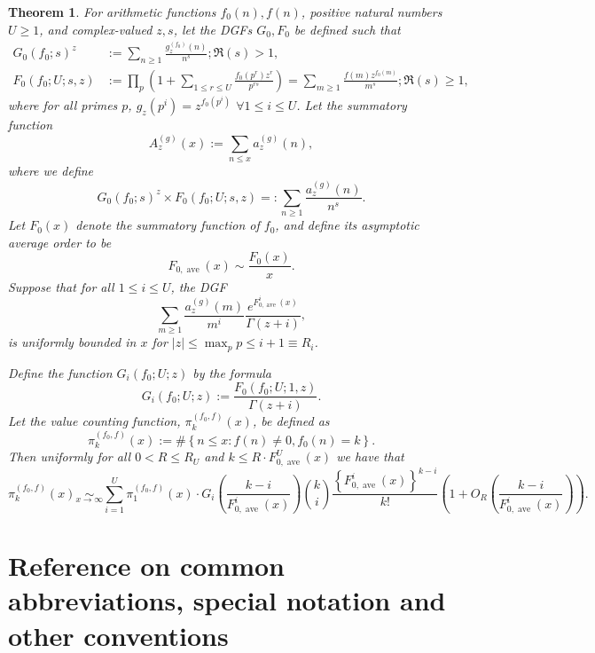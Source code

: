 \documentclass[11pt,reqno,a4letter]{article}
\numberwithin{figure}{section}
\numberwithin{table}{section}
\theoremstyle{plain}
\newtheorem{theorem}{Theorem}
\numberwithin{theorem}{section}
\theoremstyle{definition}
\begin{document}
\begin{theorem} 
For arithmetic functions $f_0(n), f(n)$, positive natural numbers $U \geq 1$, and 
complex-valued $z, s$, let the DGFs $G_0, F_0$ be defined such that 
\begin{align*} 
G_0(f_0; s)^z & := \sum_{n \geq 1} \frac{g_z^{(f_0)}(n)}{n^s}; \Re(s) > 1, \\ 
F_0(f_0; U; s, z) & := \prod_{p} \left(1 + \sum_{1 \leq r \leq U} \frac{f_0(p^r) z^r}{p^{rs}}\right) = 
     \sum_{m \geq 1} \frac{f(m) z^{f_0(m)}}{m^s}; \Re(s) \geq 1, 
\end{align*} 
where for all primes $p$, $g_z(p^i) = z^{f_0(p^i)}$ $\forall 1 \leq i \leq U$. Let the summatory function 
$$A^{(g)}_z(x) := \sum_{n \leq x} a_z^{(g)}(n),$$ where we define 
\[
G_0(f_0; s)^z \times F_0(f_0; U; s, z) =: \sum_{n \geq 1} \frac{a_z^{(g)}(n)}{n^s}. 
\]
Let $F_0(x)$ denote the summatory function of $f_0$, and define its asymptotic average order to be 
\[
F_{0,\operatorname{ave}}(x) \sim \frac{F_0(x)}{x}. 
\]
Suppose that for all $1 \leq i \leq U$, the DGF 
\[
\sum_{m \geq 1} \frac{a_z^{(g)}(m)}{m^i} \frac{e^{F_{0,\operatorname{ave}}^{i}(x)}}{\Gamma(z+i)}, 
\]
is uniformly bounded in $x$ for $|z| \leq \max_{p} p \leq i+1 \equiv R_i$. 

Define the function $G_i(f_0; U; z)$ by the formula 
\[
G_i(f_0; U; z) := \frac{F_0(f_0; U; 1, z)}{\Gamma(z+i)}. 
\]
Let the \emph{value counting function}, $\pi_k^{(f_0, f)}(x)$, be defined as 
\[
\pi_k^{(f_0, f)}(x) := \#\left\{n \leq x: f(n) \neq 0, f_0(n) = k\right\}. 
\]
Then uniformly for all $0 < R \leq R_U$ and $k \leq R \cdot F_{0,\operatorname{ave}}^{U}(x)$ 
we have that 
\[
\pi_k^{(f_0, f)}(x) \underset{x \rightarrow \infty}{\sim} \sum_{i=1}^U \pi_1^{(f_0, f)}(x) \cdot G_i\left( 
     \frac{k-i}{F_{0,\operatorname{ave}}^{i}(x)}\right) \binom{k}{i} 
     \frac{\left\{F_{0,\operatorname{ave}}^{i}(x)\right\}^{k-i}}{k!} 
     \left(1 + O_R\left(\frac{k-i}{F_{0,\operatorname{ave}}^{i}(x)}\right)\right). 
\]
\end{theorem} 

\newpage 
\renewcommand{\refname}{References and complete bibliography links} 
{}


\newpage
\setcounter{section}{0}
\renewcommand{\thesection}{Appendix \Alph{section}}
\renewcommand{\thesubsection}{\Alph{section}.\arabic{subsection}}

\newpage
\section{Reference on common abbreviations, special notation and other conventions} 
\label{Appendix_Glossary_NotationConvs}
\end{document}
